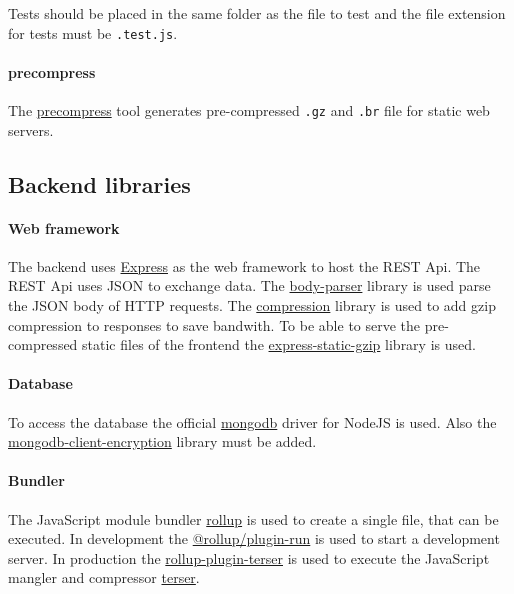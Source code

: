 Tests should be placed in the same folder as the file to test and the file extension for tests must be \texttt{.test.js}.

\paragraph{precompress}
The \href{https://www.npmjs.com/package/precompress}{precompress} tool generates pre-compressed \texttt{.gz} and \texttt{.br} file for static web servers.

\subsection{Backend libraries}

\paragraph{Web framework}
The backend uses \href{https://expressjs.com}{Express} as the web framework to host the REST Api.
The REST Api uses JSON to exchange data.
The \href{https://www.npmjs.com/package/body-parser}{body-parser} library is used parse the JSON body of HTTP requests.
The \href{https://www.npmjs.com/package/compression}{compression} library is used to add gzip compression to responses to save bandwith.
To be able to serve the pre-compressed static files of the frontend the \href{https://www.npmjs.com/package/express-static-gzip}{express-static-gzip} library is used.

\paragraph{Database}
To access the database the official \href{https://www.npmjs.com/package/mongodb}{mongodb} driver for NodeJS is used.
Also the \href{https://www.npmjs.com/package/mongodb-client-encryption}{mongodb-client-encryption} library must be added.

\paragraph{Bundler}
The JavaScript module bundler \href{https://rollupjs.org}{rollup} is used to create a single file, that can be executed.
In development the \href{https://www.npmjs.com/package/@rollup/plugin-run}{@rollup/plugin-run} is used to start a development server.
In production the \href{https://www.npmjs.com/package/rollup-plugin-terser}{rollup-plugin-terser} is used to execute the JavaScript mangler and compressor \href{https://terser.org}{terser}.
